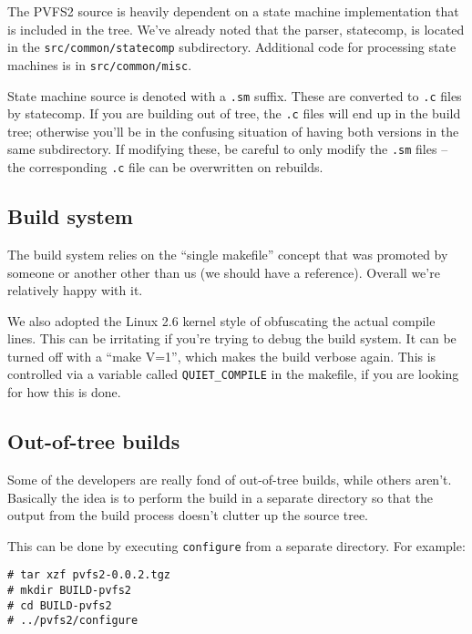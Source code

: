 The PVFS2 source is heavily dependent on a state machine implementation that
is included in the tree.  We've already noted that the parser, statecomp, is
located in the \texttt{src/common/statecomp} subdirectory.  Additional code
for processing state machines is in \texttt{src/common/misc}.

State machine source is denoted with a \texttt{.sm} suffix.  These are
converted to \texttt{.c} files by statecomp.  If you are building out of tree,
the \texttt{.c} files will end up in the build tree; otherwise you'll be in
the confusing situation of having both versions in the same subdirectory.  If
modifying these, be careful to only modify the \texttt{.sm} files -- the
corresponding \texttt{.c} file can be overwritten on rebuilds.

\subsection{Build system}

The build system relies on the ``single makefile'' concept that was promoted
by someone or another other than us (we should have a reference).  Overall
we're relatively happy with it.

We also adopted the Linux 2.6 kernel style of obfuscating the actual compile
lines.  This can be irritating if you're trying to debug the build system.  It
can be turned off with a ``make V=1'', which makes the build verbose again.
This is controlled via a variable called \texttt{QUIET\_COMPILE} in the
makefile, if you are looking for how this is done.

\subsection{Out-of-tree builds}

Some of the developers are really fond of out-of-tree builds, while others
aren't.  Basically the idea is to perform the build in a separate directory so
that the output from the build process doesn't clutter up the source tree.

This can be done by executing \texttt{configure} from a separate directory.
For example:
\begin{verbatim}
# tar xzf pvfs2-0.0.2.tgz
# mkdir BUILD-pvfs2
# cd BUILD-pvfs2
# ../pvfs2/configure
\end{verbatim}




